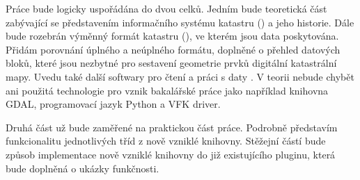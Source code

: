 Práce bude logicky uspořádána do dvou celků. Jedním bude teoretická část zabývající se představením informačního systému katastru () a jeho historie. Dále bude rozebrán výměnný formát katastru (), ve kterém jsou data poskytována. Přidám porovnání úplného a neúplného formátu, doplněné o přehled datových bloků, které jsou nezbytné pro sestavení geometrie prvků digitální katastrální mapy. Uvedu také další softwary pro čtení a práci s daty . V teorii nebude chybět ani použitá technologie pro vznik bakalářské práce jako například knihovna GDAL, programovací jazyk Python a VFK driver.

Druhá část už bude zaměřené na praktickou část práce. Podrobně představím funkcionalitu jednotlivých tříd z nově vzniklé knihovny. Stěžejní částí bude způsob implementace nově vzniklé knihovny do již existujícího pluginu, která bude doplněná o ukázky funkčnosti.


